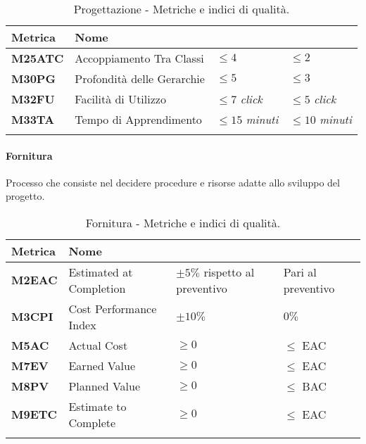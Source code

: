 \hspace{1pt}
    \begin{longtable}{|C{1.5cm}|L{3cm}|L{2.5cm}|L{2.5cm}|}
        \hline
        \textbf{Metrica} & \textbf{Nome} & \textbf{} & \textbf{} \\
        \hline
        \textbf{M25ATC} & Accoppiamento Tra Classi & $\leq 4$  & $\leq 2$ \\
        \hline
        \textbf{M30PG} & Profondità delle Gerarchie & $\leq 5$  & $\leq 3$ \\
        \hline
        \textbf{M32FU} & Facilità di Utilizzo & $\leq 7$ \textit{click}  & $\leq 5$ \textit{click} \\
        \hline
        \textbf{M33TA} & Tempo di Apprendimento & $\leq 15$ \textit{minuti}  & $\leq 10$ \textit{minuti} \\
        \hline
    \caption{Progettazione - Metriche e indici di qualità.}
    \label{tab:progettazione_progetto}
\end{longtable}

\paragraph{Fornitura}
Processo che consiste nel decidere procedure e risorse
adatte allo sviluppo del progetto.

\hspace{1pt}
    \begin{longtable}{|C{1.5cm}|L{3cm}|L{2.5cm}|L{2.5cm}|}
        \hline
        \textbf{Metrica} & \textbf{Nome} & \textbf{} & \textbf{} \\
        \hline
        \textbf{M2EAC} & Estimated at Completion & $\pm 5\%$ rispetto al preventivo & Pari al preventivo \\
        \hline
        \textbf{M3CPI} & Cost Performance Index & $\pm 10\%$ & $0\%$ \\
        \hline
        \textbf{M5AC} & Actual Cost & $\geq 0 $ & $ \leq$ EAC  \\
        \hline
        \textbf{M7EV} & Earned Value & $\geq 0 $ & $\leq$ EAC  \\
        \hline
        \textbf{M8PV} & Planned Value & $\geq 0  $ & $ \leq$ BAC  \\
        \hline
        \textbf{M9ETC} & Estimate to Complete & $\geq 0  $ & $ \leq$ EAC  \\
        \hline
    \caption{Fornitura - Metriche e indici di qualità.}
    \label{tab:controllo_progetto}
\end{longtable}

